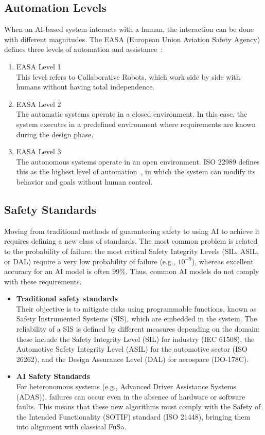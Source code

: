 \subsection{Automation Levels}
When an AI-based system interacts with a human, the interaction can be done with different magnitudes. The EASA (European Union Aviation Safety Agency) defines three levels of automation and assistance~\cite{agirre2025functional}:
\begin{enumerate}
    \item EASA Level 1 \\
        This level refers to Collaborative Robots, which work side by side with humans without having total independence.
    \item EASA Level 2 \\
        The automatic systems operate in a closed environment. In this case, the system executes in a predefined environment where requirements are known during the design phase.
    \item EASA Level 3 \\
        The autonomous systems operate in an open environment. ISO 22989 defines this as the highest level of automation~\cite{perez2024artificial}, in which the system can modify its behavior and goals without human control.
\end{enumerate}

\subsection{Safety Standards}
\label{sec:standard}
Moving from traditional methods of guaranteeing safety to using AI to achieve it requires defining a new class of standards. The most common problem is related to the probability of failure: the most critical Safety Integrity Levels (SIL, ASIL, or DAL) require a very low probability of failure (e.g., $10^{-9}$), whereas excellent accuracy for an AI model is often 99\%. Thus, common AI models do not comply with these requirements.
\begin{itemize}
    \item \textbf{Traditional safety standards} \\
        Their objective is to mitigate risks using programmable functions, known as Safety Instrumented Systems (SIS), which are embedded in the system. The reliability of a SIS is defined by different measures depending on the domain: these include the Safety Integrity Level (SIL) for industry (IEC 61508), the Automotive Safety Integrity Level (ASIL) for the automotive sector (ISO 26262), and the Design Assurance Level (DAL) for aerospace (DO-178C).
    \item \textbf{AI Safety Standards} \\
        For heteronomous systems (e.g., Advanced Driver Assistance Systems (ADAS)), failures can occur even in the absence of hardware or software faults. This means that these new algorithms must comply with the Safety of the Intended Functionality (SOTIF) standard (ISO 21448), bringing them into alignment with classical FuSa.
\end{itemize}

